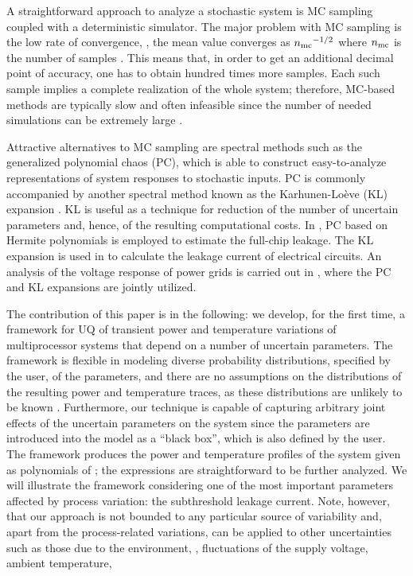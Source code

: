 
A straightforward approach to analyze a stochastic system is MC sampling coupled with a deterministic simulator.
The major problem with MC sampling is the low rate of convergence, \eg, the mean value converges as ${n_\text{mc}}^{-{{1}/{2}}}$ where ${n_\text{mc}}$ is the number of samples \cite{xiu2010, maitre2010}.
This means that, in order to get an additional decimal point of accuracy, one has to obtain hundred times more samples.
Each such sample implies a complete realization of the whole system; therefore, MC-based methods are typically slow and often infeasible since the number of needed simulations can be extremely large \cite{diaz-emparanza2002}.

Attractive alternatives to MC sampling are spectral methods \cite{xiu2010, maitre2010} such as the generalized polynomial chaos (PC), which is able to construct easy-to-analyze representations of system responses to stochastic inputs.
PC is commonly accompanied by another spectral method known as the Karhunen-Lo\`{e}ve (KL) expansion \cite{ghanem1991}. KL is useful as a technique for reduction of the number of uncertain parameters and, hence, of the resulting computational costs.
In \cite{shen2009}, PC based on Hermite polynomials is employed to estimate the full-chip leakage.
The KL expansion is used in \cite{bhardwaj2006} to calculate the leakage current of electrical circuits.
An analysis of the voltage response of power grids is carried out in \cite{ghanta2006}, where the PC and KL expansions are jointly utilized.

The contribution of this paper is in the following: we develop, for the first time, a framework for UQ of transient power and temperature variations of multiprocessor systems that depend on a number of uncertain parameters.
The framework is flexible in modeling diverse probability distributions, specified by the user, of the parameters, and there are no assumptions on the distributions of the resulting power and temperature traces, as these distributions are unlikely to be known \apriori.
Furthermore, our technique is capable of capturing arbitrary joint effects of the uncertain parameters on the system since the parameters are introduced into the model as a ``black box'', which is also defined by the user.
The framework produces the power and temperature profiles of the system given as polynomials of \rvs; the expressions are straightforward to be further analyzed. We will illustrate the framework considering one of the most important parameters affected by process variation: the subthreshold leakage current.
Note, however, that our approach is not bounded to any particular source of variability and, apart from the process-related variations, can be applied to other uncertainties such as those due to the environment, \ie, fluctuations of the supply voltage, ambient temperature, \etc
